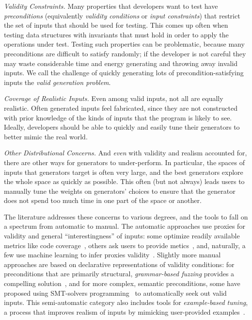 {\em Validity Constraints.}
Many properties that developers want to test have {\em preconditions}
(equivalently {\em validity conditions} or {\em input constraints}) that
restrict the set of inputs that should be used for testing. This comes up often
when testing data structures with invariants that must hold in order to apply
the operations under test.  Testing such properties can be problematic, because
many preconditions are difficult to satisfy randomly; if the developer is not
careful they may waste considerable time and energy generating and throwing away
invalid inputs. We call the challenge of quickly generating lots of
precondition-satisfying inputs the {\em valid generation problem}.

{\em Coverage of Realistic Inputs.}
Even among valid inputs, not all are equally realistic. Often generated inputs
feel fabricated, since they are not constructed with prior knowledge of the
kinds of inputs that the program is likely to see. Ideally, developers should be
able to quickly and easily tune their generators to better mimic the real world.

{\em Other Distributional Concerns.}
And {\em even} with validity and realism accounted for, there are other ways for
generators to under-perform. In particular, the spaces of inputs that generators
target is often very large, and the best generators explore the whole space as
quickly as possible. This often (but not always) leads users to manually tune
the weights on generators' choices to ensure that the generator does not spend
too much time in one part of the space or another.

The literature addresses these concerns to various degrees, and the tools to
fall on a spectrum from automatic to manual. The automatic approaches use
proxies for validity and general ``interestingness'' of inputs: some optimize
readily available metrics like code coverage~\cite{afl-readme}, others ask users
to provide metics~\cite{loscher2017targetedpbt}, and, naturally, a few use
machine learning to infer proxies validity~\cite{godefroid2017learn,
DBLP:conf/icse/ReddyLPS20}. Slightly more manual approaches are based on
declarative representations of validity conditions: for preconditions that are
primarily structural, {\em grammar-based fuzzing} provides a compelling
solution~\cite{godefroid2008grammar, holler2012fuzzing, veggalam2016ifuzzer,
wang2019superion, srivastava2021gramatron}, and for more complex, semantic
preconditions, some have proposed using SMT-solvers
programming~\cite{dewey2017automated, LuckPOPL, steinhofel2022input} to
automatically seek out valid inputs. This semi-automatic category also includes
tools for {\em example-based tuning}, a process that improves realism of inputs
by mimicking user-provided examples~\cite{soremekun2020inputs}.

